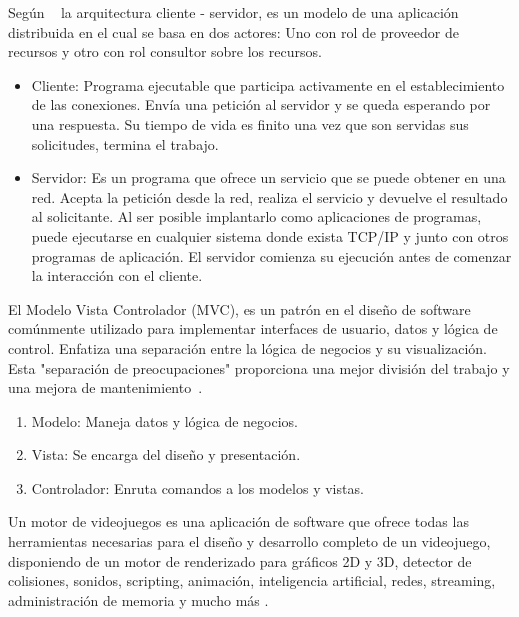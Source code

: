 
Según ~\cite{moyano2020arquitectura} la arquitectura cliente - servidor, es un modelo de una aplicación distribuida en el cual se basa en dos actores: Uno con rol de proveedor de recursos y otro con rol consultor sobre los recursos.
\begin{itemize}
    \item Cliente: Programa ejecutable que participa activamente en el establecimiento de las conexiones. Envía una petición al servidor y se queda esperando por una respuesta. Su tiempo de vida es finito una vez que son servidas sus solicitudes, termina el trabajo.
    \item Servidor: Es un programa que ofrece un servicio que se puede obtener en una red. Acepta la petición desde la red, realiza el servicio y devuelve el resultado al solicitante. Al ser posible implantarlo como aplicaciones de programas, puede ejecutarse en cualquier sistema donde exista TCP/IP y junto con otros programas de aplicación. El servidor comienza su ejecución antes de comenzar la interacción con el cliente.
\end{itemize}

 El Modelo Vista Controlador (MVC), es un patrón en el diseño de software comúnmente utilizado para implementar interfaces de usuario, datos y lógica de control. Enfatiza una separación entre la lógica de negocios y su visualización. Esta "separación de preocupaciones" proporciona una mejor división del trabajo y una mejora de mantenimiento~\cite{MVCGlosa42}. 
\begin{enumerate}
    \item Modelo: Maneja datos y lógica de negocios.
    \item Vista: Se encarga del diseño y presentación.
    \item Controlador: Enruta comandos a los modelos y vistas.
\end{enumerate}

Un motor de videojuegos es una aplicación de software que ofrece todas las herramientas necesarias para el diseño y desarrollo completo de un videojuego, disponiendo de un motor de renderizado para gráficos 2D y 3D, detector de colisiones, sonidos, scripting, animación, inteligencia artificial, redes, streaming, administración de memoria y mucho más \cite{arce2011desarrollo}.

